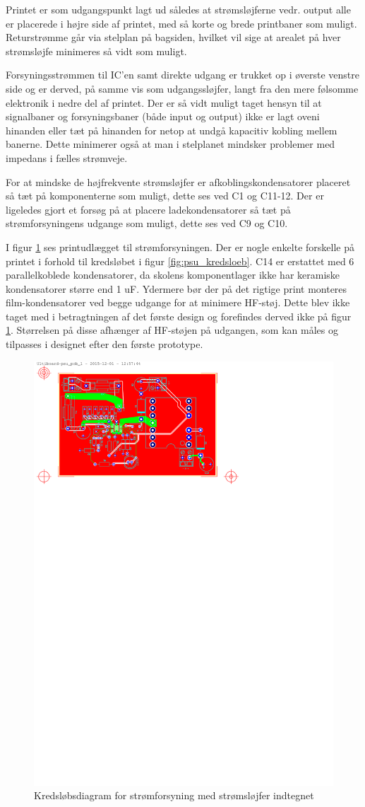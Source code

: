 Printet er som udgangspunkt lagt ud således at strømsløjferne vedr. output alle er placerede i højre side af printet, med så korte og brede printbaner som muligt. 
Returstrømme går via stelplan på bagsiden, hvilket vil sige at arealet på hver strømsløjfe minimeres så vidt som muligt.

Forsyningsstrømmen til IC'en samt direkte udgang er trukket op i øverste venstre side og er derved, på samme vis som udgangssløjfer, langt fra den mere følsomme elektronik i nedre del af printet. 
Der er så vidt muligt taget hensyn til at signalbaner og forsyningsbaner (både input og output) ikke er lagt oveni hinanden eller tæt på hinanden for netop at undgå kapacitiv kobling mellem banerne.
Dette minimerer også at man i stelplanet mindsker problemer med impedans i fælles strømveje. 

For at mindske de højfrekvente strømsløjfer er afkoblingskondensatorer placeret så tæt på komponenterne som muligt, dette ses ved C1 og C11-12.
Der er ligeledes gjort et forsøg på at placere ladekondensatorer så tæt på strømforsyningens udgange som muligt, dette ses ved C9 og C10.

I figur \ref{fig:psu_pcb} ses printudlægget til strømforsyningen.
Der er nogle enkelte forskelle på printet i forhold til kredsløbet i figur \ref{fig:psu_kredsloeb}.
C14 er erstattet med 6 parallelkoblede kondensatorer, da skolens komponentlager ikke har keramiske kondensatorer større end 1 uF.
Ydermere bør der på det rigtige print monteres film-kondensatorer ved begge udgange for at minimere HF-støj.
Dette blev ikke taget med i betragtningen af det første design og forefindes derved ikke på figur \ref{fig:psu_pcb}.
Størrelsen på disse afhænger af HF-støjen på udgangen, som kan måles og tilpasses i designet efter den første prototype.

\clearpage

\begin{landscape}
\begin{figure}
\centering
\includegraphics[height=\textwidth-2.5cm, clip=true, trim=50 615 234 25]{../fig/diagrammer/bil/psu_pcb_twoside}
\caption{Kredsløbsdiagram for strømforsyning med strømsløjfer indtegnet}
\label{fig:psu_pcb}
\end{figure}
\end{landscape}


